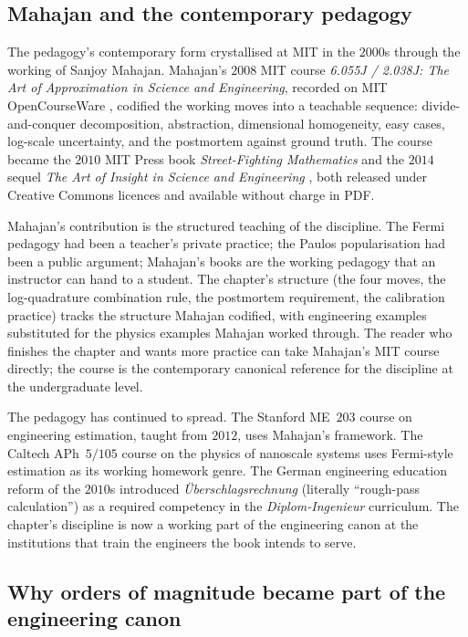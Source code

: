 \subsection{Mahajan and the contemporary pedagogy}

The pedagogy's contemporary form crystallised at MIT in the
$2000$s through the working of Sanjoy Mahajan. Mahajan's
$2008$ MIT course \emph{6.055J / 2.038J: The Art of
Approximation in Science and Engineering}, recorded on MIT
OpenCourseWare \cite{web:ch09t3-mit-6055j}, codified the
working moves into a teachable sequence: divide-and-conquer
decomposition, abstraction, dimensional homogeneity, easy
cases, log-scale uncertainty, and the postmortem against
ground truth. The course became the $2010$ MIT Press book
\emph{Street-Fighting Mathematics}
\cite{text:ch09t3-mahajan-streetfighting-2010} and the $2014$
sequel \emph{The Art of Insight in Science and Engineering}
\cite{text:mahajan2014}, both released under Creative Commons
licences and available without charge in PDF.

Mahajan's contribution is the structured teaching of the
discipline. The Fermi pedagogy had been a teacher's private
practice; the Paulos popularisation had been a public
argument; Mahajan's books are the working pedagogy that an
instructor can hand to a student. The chapter's structure (the
four moves, the log-quadrature combination rule, the
postmortem requirement, the calibration practice) tracks the
structure Mahajan codified, with engineering examples
substituted for the physics examples Mahajan worked through.
The reader who finishes the chapter and wants more practice
can take Mahajan's MIT course directly; the course is the
contemporary canonical reference for the discipline at the
undergraduate level.

The pedagogy has continued to spread. The Stanford ME~$203$
course on engineering estimation, taught from $2012$, uses
Mahajan's framework. The Caltech APh~$5/105$ course on the
physics of nanoscale systems uses Fermi-style estimation as
its working homework genre. The German engineering education
reform of the $2010$s introduced \emph{\"Uberschlagsrechnung}
(literally ``rough-pass calculation'') as a required
competency in the \emph{Diplom-Ingenieur} curriculum. The
chapter's discipline is now a working part of the engineering
canon at the institutions that train the engineers the book
intends to serve.

\subsection{Why orders of magnitude became part of the
engineering canon}

